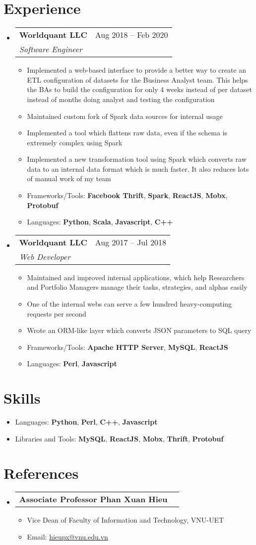 \documentclass[a4paper,11pt]{article}
\makeatletter
\newcommand{\resumeItem}[1]{
  \item\small{
    {#1 \vspace{-2pt}}
  }
}
\newcommand{\resumeSubheadTwo}[2]{
  \vspace{-1pt}\item
    \begin{tabular*}{0.97\textwidth}{l@{\extracolsep{\fill}}r}
      \textbf{#1} & #2
    \end{tabular*}\vspace{-5pt}
}
\newcommand{\resumeSubhead}[3]{
  \vspace{-1pt}\item
    \begin{tabular*}{0.97\textwidth}{l@{\extracolsep{\fill}}r}
      \textbf{#1} & #2 \\
      \textit{\normalsize#3}
    \end{tabular*}\vspace{-5pt}
}
\newcommand{\resumeSubHeadingListStart}{\begin{itemize}[leftmargin=*]}
\newcommand{\resumeSubHeadingListEnd}{\end{itemize}}
\newcommand{\resumeItemListStart}{\begin{itemize}}
\newcommand{\resumeItemListEnd}{\end{itemize}\vspace{-5pt}}
\makeatother
\begin{document}
\section{Experience}
  \resumeSubHeadingListStart
    \resumeSubhead
      {Worldquant LLC}{Aug 2018 – Feb 2020}
      {Software Engineer}
      \resumeItemListStart
        \resumeItem{Implemented a web-based interface to provide a better way to create an ETL configuration of datasets for the Business Analyst team. This helps the BAs to build the configuration for only 4 weeks instead of per dataset instead of months doing analyst and testing the configuration}
        \resumeItem{Maintained custom fork of Spark data sources for internal usage}
        \resumeItem{Implemented a tool which flattens raw data, even if the schema is extremely complex using Spark}
        \resumeItem{Implemented a new transformation tool using Spark which converts raw data to an internal data format which is much faster. It also reduces lots of manual work of my team}
        \resumeItem{Frameworks/Tools: \textbf{Facebook Thrift}, \textbf{Spark}, \textbf{ReactJS}, \textbf{Mobx}, \textbf{Protobuf}}
        \resumeItem{Languages: \textbf{Python}, \textbf{Scala}, \textbf{Javascript}, \textbf{C++}}
      \resumeItemListEnd

    \resumeSubhead
      {Worldquant LLC}{Aug 2017 – Jul 2018}
      {Web Developer}
      \resumeItemListStart
        \resumeItem{Maintained and improved internal applications, which help Researchers and Portfolio Managers manage their tasks, strategies, and alphas easily}
        \resumeItem{One of the internal webs can serve a few hundred heavy-computing requests per second}
        \resumeItem{Wrote an ORM-like layer which converts JSON parameters to SQL query}
        \resumeItem{Frameworks/Tools: \textbf{Apache HTTP Server}, \textbf{MySQL}, \textbf{ReactJS}}
        \resumeItem{Languages: \textbf{Perl}, \textbf{Javascript}}
      \resumeItemListEnd
  \resumeSubHeadingListEnd

\section{Skills}
  \resumeItemListStart
    \resumeItem{Languages: \textbf{Python}, \textbf{Perl}, \textbf{C++}, \textbf{Javascript}}
    \resumeItem{Libraries and Tools: \textbf{MySQL}, \textbf{ReactJS}, \textbf{Mobx}, \textbf{Thrift}, \textbf{Protobuf}}
  \resumeItemListEnd

\section{References}
  \resumeSubHeadingListStart
    \resumeSubheadTwo
      {Associate Professor Phan Xuan Hieu}{}
      \resumeItemListStart
        \resumeItem{Vice Dean of Faculty of Information and Technology, VNU-UET}
        \resumeItem{Email: \href{mailto:hieupx@vnu.edu.vn}{hieupx@vnu.edu.vn}}
      \resumeItemListEnd
  \resumeSubHeadingListEnd
\end{document}

